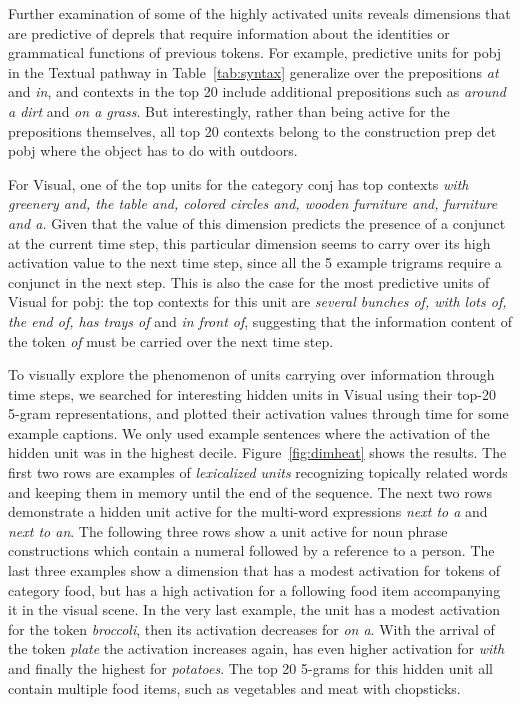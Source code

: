 Further examination of some of the highly activated units reveals dimensions
that are predictive of deprels that require information about the
identities or grammatical functions of previous tokens. For example,
predictive units for {\sc pobj} in the {\sc Textual} pathway in Table~\ref{tab:syntax}
generalize over the prepositions {\it at} and {\it in}, and contexts in the top 20 include 
additional prepositions such as {\it around a dirt} and {\it on a grass}. But interestingly, 
rather than being active for the prepositions themselves, all top 20 contexts belong to the 
construction {\sc prep det pobj} where the object has to do with outdoors. 

For {\sc Visual}, one of the top units for the category {\sc conj} has top contexts 
{\it with greenery and, the table and, colored circles and, wooden furniture and, furniture 
and a.} Given that the value of this dimension predicts the presence of a conjunct at the 
current time step, this particular dimension seems to carry over its high activation value
to the next time step, since all the 5 example trigrams require a
conjunct in the next step.  This is also the case for the most predictive units of {\sc Visual} for {\sc pobj}:
the top contexts for this unit are {\it several bunches of, with lots of, the end of, has trays 
of} and {\it in front of}, suggesting that the information content of
the token {\it of} must be carried over the next time step.

To visually explore the phenomenon of units carrying over information through time steps, 
we searched for interesting hidden units in {\sc Visual} using their top-20 5-gram 
representations, and plotted their activation values through time for some example 
captions. We only used example sentences where the activation of the hidden unit 
was in the highest decile. Figure~\ref{fig:dimheat} shows the results.
The first two rows are examples of \emph{lexicalized units} recognizing topically
related words and keeping them in memory until the end of the sequence. 
The next two rows demonstrate a hidden unit active for the multi-word expressions
\emph{next to a} and \emph{next to an}.  The following three rows show a unit
active for noun phrase constructions which contain a numeral followed
by a reference to a person. 
The last three examples show a dimension that has a modest activation for tokens of 
category {\sc food}, but has a high activation for a following food item accompanying it in 
the visual scene. In the very last example, the unit has a modest activation for the token 
\emph{broccoli}, then its activation decreases for \emph{on a}. With the arrival of the token 
\emph{plate} the activation increases again, has even higher activation for \emph{with} and 
finally the highest for \emph{potatoes}. The top 20 5-grams for this hidden unit all contain 
multiple food items, such as vegetables and meat with chopsticks.

